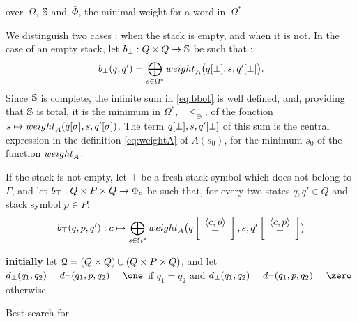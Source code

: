 over~$\Omega$, $\mathbb{S}$ and~$\bar\Phi$,
the minimal weight %
for a word in~$\Omega^*$.
%




\noindent
We distinguish two cases : when the stack is empty, and when it is not.
%
In the case of an empty stack, let $b_\bot : Q \times Q \to \mathbb{S}$ be such that : %
%
\begin{equation}\label{eq:bbot}
  b_\bot(q, q') = \bigoplus_{s\in \Omega^*}
  \textstyle
  \weight_A\bigl(\config{q}{\bot}, s, \config{q'}{\bot}\bigr).
\end{equation}
%
Since $\mathbb{S}$ is complete, the infinite sum in \eqref{eq:bbot} is well defined,
and, providing that $\mathbb{S}$ is total, it is the minimum in $\Omega^*$,
\wrt~$\leq_\oplus$, %
of the fonction
$s \mapsto \weight_A(\config{q}{\sigma}, s, \config{q'}{\sigma})$.
%
The term $q[{\bot}], s, q'[{\bot}]$
of this sum is the central expression in
the definition \eqref{eq:weightA} of $A(s_0)$, for the minimum $s_0$
of the function $\weight_A$.

%
\noindent
If the stack is not empty, let $\top$ be a fresh stack symbol which does not belong to $\Gamma$,
and let $b_\top : Q \times P \times Q \to \Phic$ be such that,
for every two states $q, q' \in Q$
and stack symbol $p \in P$: %
\begin{equation}\label{eq:btop}
  b_\top(q, p, q') : c \mapsto \bigoplus_{s\in \Omega^*}
  \textstyle
  \weight_A\bigl(\configup{q}{\< c, p> \stackup \top }, s, \configup{q'}{\<c, p> \stackup \top}\bigr)
\end{equation}
%

\begin{algorithm}

\textbf{initially} let $\mathcal{Q} = (Q \times Q) \cup (Q \times P \times Q)$, %
and let $d_\bot(q_1, q_2) = d_\top(q_1, p, q_2) = \one$
if $q_1 = q_2$ and $d_\bot(q_1, q_2) = d_\top(q_1, p, q_2) = \zero$ otherwise$\;$

\smallskip\noindent
{}
\caption{Best search for \SWVPA}
\label{algo:Dijkstra}
\end{algorithm}


